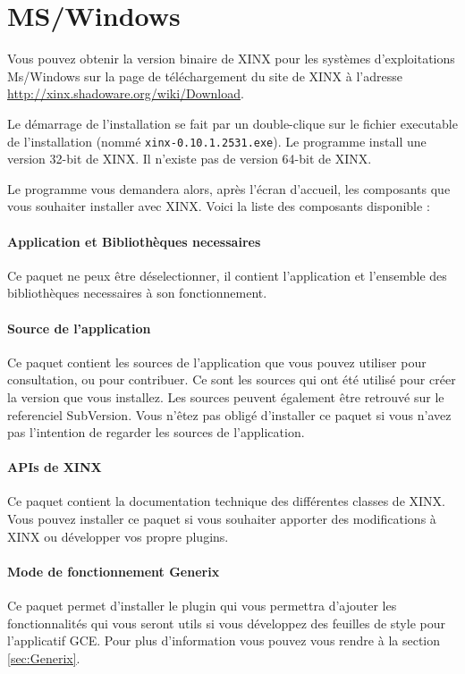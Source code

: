 \documentclass[a4paper,10pt,twoside]{book}
\begin{document}
\section{MS/Windows}

Vous pouvez obtenir la version binaire de XINX pour les systèmes d'exploitations Ms/Windows sur la page de téléchargement du site de XINX à l'adresse \url{http://xinx.shadoware.org/wiki/Download}. 

Le démarrage de l'installation se fait par un double-clique sur le fichier executable de l'installation (nommé \verb+xinx-0.10.1.2531.exe+). Le programme install une version 32-bit de XINX. Il n'existe pas de version 64-bit de XINX.

Le programme vous demandera alors, après l'écran d'accueil, les composants que vous souhaiter installer avec XINX. Voici la liste des composants disponible :

\paragraph{Application et Bibliothèques necessaires} Ce paquet ne peux être déselectionner, il contient l'application et l'ensemble des bibliothèques necessaires à son fonctionnement.
\paragraph{Source de l'application} Ce paquet contient les sources de l'application que vous pouvez utiliser pour consultation, ou pour contribuer. Ce sont les sources qui ont été utilisé pour créer la version que vous installez. Les sources peuvent également être retrouvé sur le referenciel SubVersion. Vous n'êtez pas obligé d'installer ce paquet si vous n'avez pas l'intention de regarder les sources de l'application.
\paragraph{APIs de XINX} Ce paquet contient la documentation technique des différentes classes de XINX. Vous pouvez installer ce paquet si vous souhaiter apporter des modifications à XINX ou développer vos propre plugins.
\paragraph{Mode de fonctionnement Generix} Ce paquet permet d'installer le plugin qui vous permettra d'ajouter les fonctionnalités qui vous seront utils si vous développez des feuilles de style pour l'applicatif GCE. Pour plus d'information vous pouvez vous rendre à la section \ref{sec:Generix}.
\end{document}
